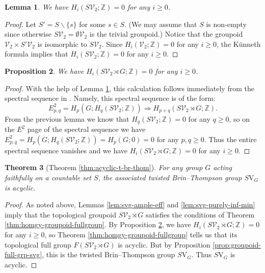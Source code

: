\documentclass[10pt,a4paper]{amsart}
\numberwithin{equation}{section}
\numberwithin{figure}{section}
\newtheorem{thm}{Theorem}[section]
\newtheorem{lem}[thm]{Lemma}
\newtheorem{prop}[thm]{Proposition}
\theoremstyle{definition}
\newcommand{\cV}{\mathcal{V}}
\newcommand{\bZ}{\mathbb{Z}}
\newcommand{\V}{\mathrm{V}}
\renewcommand{\geq}{\geqslant}
\begin{document}
\begin{lem}
\label{lem:groupoid-sv-acyclic}
We have $H_i(S\mathcal{V}_2;\mathbb{Z}) = 0$ for any $i\geq 0$.
\end{lem}
\begin{proof}
Let $S' = S \smallsetminus \{s\}$ for some $s \in S$. (We may assume that $S$ is non-empty since otherwise $S\cV_2 = \emptyset\cV_2$ is the trivial groupoid.) Notice that the groupoid $\cV_2 \times S'\cV_2$ is isomorphic to $S\cV_2$. Since $H_i(\mathcal{V}_2;\mathbb{Z}) = 0$ for any $i\geq 0$, the K\"unneth formula \cite[Theorem 2.4]{Matui2016} implies that $H_i(S\mathcal{V}_2;\mathbb{Z}) = 0$ for any $i\geq 0$.
\end{proof}

\begin{prop}
\label{prop:groupoi-svg-cyclic}
We have $H_i(S\mathcal{V}_2\rtimes {G};\mathbb{Z}) = 0$ for any $i\geq 0$.
\end{prop}
\begin{proof}
With the help of Lemma \ref{lem:groupoid-sv-acyclic}, this calculation follows immediately from the spectral sequence in \cite[Theorem 3.8(2)]{Matui2012}. Namely, this spectral sequence is of the form:
\[
E^2_{p,q} = H_p(G; H_q(S\cV_2;\bZ)) \Rightarrow H_{p+q}(S\cV_2\rtimes G;\bZ).
\]
From the previous lemma we know that $H_q(S\mathcal{V}_2; \mathbb{Z}) = 0$ for any $q\geq 0$, so on the $E^2$ page of the spectral sequence we have $E_{p,q}^2 = H_p(G; H_q(S\cV_2;\bZ)) = H_p(G;0) = 0$ for any $p,q\geq 0$. Thus the entire spectral sequence vanishes and we have $H_i(S\mathcal{V}_2\rtimes {G}; \mathbb{Z}) = 0$ for any $i\geq 0$.
\end{proof}

\begin{thm}[Theorem \ref{thm:acyclic-t-br-thom}]
\label{thm:tbt-acyc}
For any group $G$ acting faithfully on a countable set $S$, the associated twisted Brin--Thompson group $S\mathrm{V}_G$ is acyclic.
\end{thm}
\begin{proof}
As noted above, Lemmas \ref{lem:svg-ample-eff} and \ref{lem:svg-purely-inf-min} imply that the topological groupoid $S\cV_2 \rtimes G$ satisfies the conditions of Theorem \ref{thm:homgy-groupoid-fullgroup}. By Proposition \ref{prop:groupoi-svg-cyclic}, we have $H_i(S\mathcal{V}_2 \rtimes G; \mathbb{Z}) = 0$ for any $i\geq 0$, so Theorem \ref{thm:homgy-groupoid-fullgroup} tells us that its topological full group $F(S\mathcal{V}_2 \rtimes G)$ is acyclic. But by Proposition \ref{prop:groupoid-full-grp-svg}, this is the twisted Brin--Thompson group $S\mathrm{V}_G$. Thus $S\V_G$ is acyclic.
\end{proof}
\end{document}
